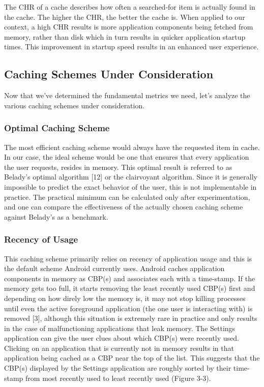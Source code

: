 \documentclass[12pt]{uthesis-v12}  %
\begin{document}
			The CHR of a cache describes how often a searched-for item is actually found in the cache. The higher the CHR, the better the cache is. When applied to our context, a high CHR results is more application components being fetched from memory, rather than disk which in turn results in quicker application startup times. This improvement in startup speed results in an enhanced user experience.   
		
		\subsection{Caching Schemes Under Consideration}
			Now that we've determined the fundamental metrics we need, let's analyze the various caching schemes under consideration.
			
			\subsubsection{Optimal Caching Scheme}
				The most efficient caching scheme would always have the requested item in cache. In our case, the ideal scheme would be one that ensures that every application the user requests, resides in memory. This optimal result is referred to as Belady's optimal algorithm [12] or the clairvoyant algorithm. Since it is generally impossible to predict the exact behavior of the user, this is not implementable in practice. The practical minimum can be calculated only after experimentation, and one can compare the effectiveness of the actually chosen caching scheme against Belady's as a benchmark.
			
			\subsubsection{Recency of Usage}
				This caching scheme primarily relies on recency of application usage and this is the default scheme Android currently uses. Android caches application components in memory as CBP(s) and associates each with a time-stamp. If the memory gets too full, it starts removing the least recently used CBP(s) first and depending on how direly low the memory is, it may not stop killing processes until even the active foreground application (the one user is interacting with) is removed [3], although this situation is extremely rare in practice and only results in the case of malfunctioning applications that leak memory. The Settings application can give the user clues about which CBP(s) were recently used. Clicking on an application that is currently not in memory results in that application being cached as a CBP near the top of the list. This suggests that the CBP(s) displayed by the Settings application are roughly sorted by their time-stamp from most recently used to least recently used (Figure 3-3). 
				
\end{document}
